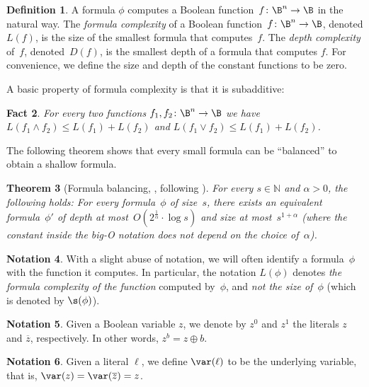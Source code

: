 \documentclass[11pt]{article}
\numberwithin{equation}{section}
\newtheorem{theorem}{Theorem}[section]
\newtheorem{fact}[theorem]{Fact}
\theoremstyle{definition}
\newtheorem{definition}[theorem]{Definition}
\theoremstyle{plain}
\newcommand{\N}{\mathbb N}
\theoremstyle{definition}\newtheorem{notation}[theorem]{Notation}\theoremstyle{plain}
\begin{document}
\begin{definition}
A formula $\phi$ computes a Boolean function~$f\colon\B^{n}\to\B$
in the natural way. The \emph{formula complexity} of a Boolean function~$f\colon\B^{n}\to\B$,
denoted $L(f)$, is the size of the smallest formula that computes~$f$.
The \emph{depth complexity} of~$f$, denoted~$D(f)$, is the smallest
depth of a formula that computes $f$. For convenience, we define
the size and depth of the constant functions to be zero. 
\end{definition}

A basic property of formula complexity is that it is subadditive: 
\begin{fact}
\label{fact:subadditivity}For every two functions $f_{1},f_{2}\colon\B^{n}\to\B$
we have $L(f_{1}\wedge f_{2})\le L(f_{1})+L(f_{2})$ and $L(f_{1}\vee f_{2})\le L(f_{1})+L(f_{2})$. 
\end{fact}

The following theorem shows that every small formula can be ``balanced''
to obtain a shallow formula. 
\begin{theorem}[Formula balancing, \cite{BB94}, following \cite{S71,B74}]
\label{thm:size-depth-tradeoff}For every $s \in \N$ and $\alpha>0$, the following
holds: For every formula~$\phi$ of size~$s$, there exists an equivalent
formula~$\phi'$ of depth at most~$O(2^{\frac{1}{\alpha}}\cdot\log s)$
and size at most~$s^{1+\alpha}$ (where the constant inside the big-O
notation does not depend on the choice of~$\alpha$).
\end{theorem}

\begin{notation}
With a slight abuse of notation, we will often identify a formula~$\phi$
with the function it computes. In particular, the notation $L(\phi)$
denotes \emph{the formula complexity of the function} computed by~$\phi$,
and \emph{not the size of~$\phi$} (which is denoted by $\s(\phi)$). 
\end{notation}

\begin{notation}
Given a Boolean variable $z$, we denote by $z^{0}$ and $z^{1}$
the literals $z$ and $\overline{z}$, respectively. In other words,
$z^{b}=z\oplus b$. 
\end{notation}

\begin{notation}
Given a literal $\ell$, we define $\var(\ell)$ to be the underlying
variable, that is, $\var(z)=\var(\overline{z})=z$. 
\end{notation}
\end{document}
